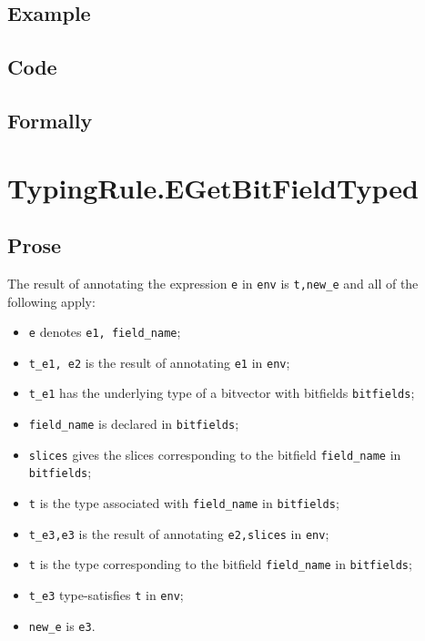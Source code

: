 \documentclass{book}
\begin{document}
  \subsection{Example}

  \subsection{Code}

\begin{emptyformal}
    \subsection{Formally}
\end{emptyformal}


\section{TypingRule.EGetBitFieldTyped \label{sec:TypingRule.EGetBitFieldTyped}}

  \subsection{Prose}
  The result of annotating the expression \texttt{e} in \texttt{env} is
\texttt{t,new\_e} and all of the following apply:
  \begin{itemize}
  \item \texttt{e} denotes \texttt{e1, field\_name};
  \item \texttt{t\_e1, e2} is the result of annotating \texttt{e1} in \texttt{env};
  \item \texttt{t\_e1} has the underlying type of a bitvector with bitfields \texttt{bitfields};
  \item \texttt{field\_name} is declared in \texttt{bitfields};
  \item \texttt{slices} gives the slices corresponding to the bitfield \texttt{field\_name} in \\
    \texttt{bitfields};
  \item \texttt{t} is the type associated with \texttt{field\_name} in \texttt{bitfields};
  \item \texttt{t\_e3,e3} is the result of annotating \texttt{e2,slices} in \texttt{env};
  \item \texttt{t} is the type corresponding to the bitfield \texttt{field\_name} in \texttt{bitfields};
  \item \texttt{t\_e3} type-satisfies \texttt{t} in \texttt{env};
  \item \texttt{new\_e} is \texttt{e3}.
  \end{itemize}
\end{document}
